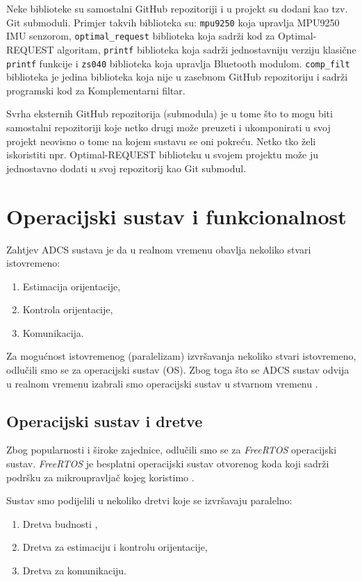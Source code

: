 \documentclass[times, utf8, diplomski, numeric]{templates/template}
\begin{document}
{{        Neke biblioteke su samostalni GitHub repozitoriji i u projekt su dodani kao tzv. Git submoduli. Primjer takvih biblioteka su: \texttt{mpu9250} koja upravlja MPU9250 IMU senzorom, \texttt{optimal\_request} biblioteka koja sadrži kod za Optimal-REQUEST algoritam, \texttt{printf} biblioteka koja sadrži jednostavniju verziju klasične \texttt{printf} funkcije i \texttt{zs040} biblioteka koja upravlja Bluetooth modulom. \texttt{comp\_filt} biblioteka je jedina biblioteka koja nije u zasebnom GitHub repozitoriju i sadrži programski kod za Komplementarni filtar. 

        Svrha eksternih GitHub repozitorija (submodula) je u tome što to mogu biti samostalni repozitoriji koje netko drugi može preuzeti i ukomponirati u svoj projekt neovisno o tome na kojem sustavu se oni pokreću. Netko tko želi iskoristiti npr. Optimal-REQUEST biblioteku u svojem projektu može ju jednostavno dodati u svoj repozitorij kao Git submodul. 
    }

    \section{Operacijski sustav i funkcionalnost}{
        Zahtjev ADCS sustava je da u realnom vremenu obavlja nekoliko stvari istovremeno:

        \begin{enumerate}
        \item Estimacija orijentacije,
        \item Kontrola orijentacije,
        \item Komunikacija.
        \end{enumerate}

        Za mogućnost istovremenog (paralelizam) izvršavanja nekoliko stvari istovremeno, odlučili smo se za operacijski sustav (OS). Zbog toga što se ADCS sustav odvija u realnom vremenu izabrali smo operacijski sustav u stvarnom vremenu .

        \subsection{Operacijski sustav i dretve}{
            Zbog popularnosti i široke zajednice, odlučili smo se za \emph{FreeRTOS} operacijski sustav. \emph{FreeRTOS} je besplatni operacijski sustav otvorenog koda koji sadrži podršku za mikroupravljač kojeg koristimo \cite{freertos}. 
    
            Sustav smo podijelili u nekoliko dretvi koje se izvršavaju paralelno:
            \begin{enumerate}
            \item Dretva budnosti ,
            \item Dretva za estimaciju i kontrolu orijentacije,
            \item Dretva za komunikaciju.
            \end{enumerate}

}}}
\end{document}

